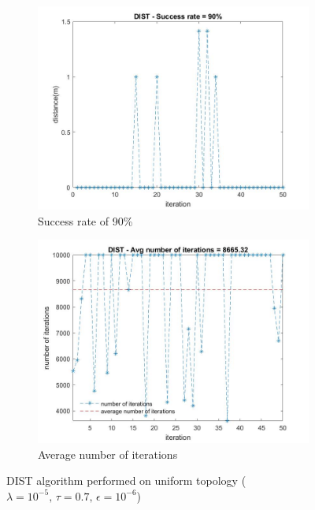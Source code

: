 \begin{figure}[H]
    \begin{subfigure}{0.45\textwidth}
        \centering
        \includegraphics[width=\textwidth]{img/DIST_distance_uniform.jpg}
        \caption{Success rate of 90\%}
    \end{subfigure}
    \hfill
    \begin{subfigure}{0.45\textwidth}
        \centering
        \includegraphics[width=\textwidth]{img/DIST_num_iterations_uniform.jpg}
        \caption{Average number of iterations}
    \end{subfigure}
    \caption{DIST algorithm performed on uniform topology ($\lambda=10^{-5},\,\tau=0.7,\,\epsilon=10^{-6}$)}
\end{figure}

